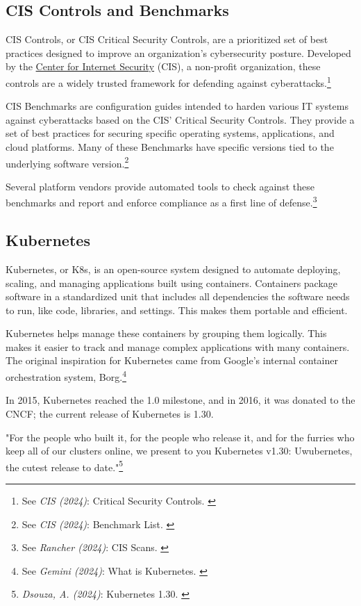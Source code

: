 \subsection{CIS Controls and Benchmarks}

CIS Controls, or CIS Critical Security Controls, are a prioritized set of best practices designed to improve an organization's cybersecurity posture. Developed by the \href{https://www.cisecurity.org/}{Center for Internet Security} (CIS), a non-profit organization, these controls are a widely trusted framework for defending against cyberattacks.\footnote{See \textit{CIS (2024)}: Critical Security Controls. \cite{cisControls}}

CIS Benchmarks are configuration guides intended to harden various IT systems against cyberattacks based on the CIS' Critical Security Controls. They provide a set of best practices for securing specific operating systems, applications, and cloud platforms. Many of these Benchmarks have specific versions tied to the underlying software version.\footnote{See \textit{CIS (2024)}: Benchmark List. \cite{cisBenchmarks}}

Several platform vendors provide automated tools to check against these benchmarks and report and enforce compliance as a first line of defense.\footnote{See \textit{Rancher (2024)}: CIS Scans. \cite{rancherBenchmarks}}

\subsection{Kubernetes}

Kubernetes, or K8s, is an open-source system designed to automate deploying, scaling, and managing applications built using containers. Containers package software in a standardized unit that includes all dependencies the software needs to run, like code, libraries, and settings. This makes them portable and efficient.

Kubernetes helps manage these containers by grouping them logically. This makes it easier to track and manage complex applications with many containers. The original inspiration for Kubernetes came from Google's internal container orchestration system, Borg.\footnote{See \textit{Gemini (2024)}: What is Kubernetes. \cite{bardKubernetes}} 

In 2015, Kubernetes reached the 1.0 milestone, and in 2016, it was donated to the CNCF; the current release of Kubernetes is 1.30.

"For the people who built it, for the people who release it, and for the furries who keep all of our clusters online, we present to you Kubernetes v1.30: Uwubernetes, the cutest release to date."\footnote{\textit{Dsouza, A. (2024)}: Kubernetes 1.30. \cite{uwubernetes}}

